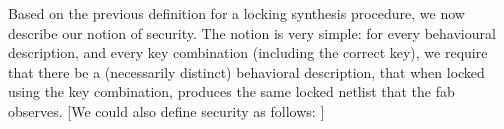  Based on the previous definition for a locking synthesis procedure, we now describe our notion of security. The notion is very simple: for every behavioural description, and every key combination (including the correct key), we require that there be a (necessarily distinct) behavioral description, that when locked using the key combination, produces the same locked netlist that the fab observes. [We could also define security as follows: ]
 



